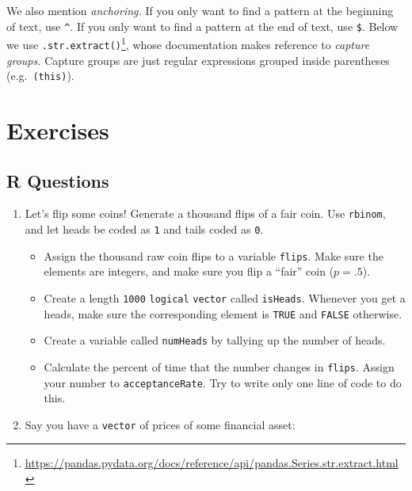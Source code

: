\documentclass[
  12pt,
  krantz2]{krantz}
\makeatletter
\newenvironment{Shaded}{\begin{snugshade}}{\end{snugshade}}
\newcommand{\BuiltInTok}[1]{#1}
\newcommand{\CommentTok}[1]{\textcolor[rgb]{0.37,0.37,0.37}{\textit{#1}}}
\newcommand{\NormalTok}[1]{#1}
\newcommand{\OperatorTok}[1]{\textcolor[rgb]{0.43,0.43,0.43}{\textbf{#1}}}
\newcommand{\StringTok}[1]{\textcolor[rgb]{0.5,0.5,0.5}{#1}}
\newcommand{\VerbatimStringTok}[1]{\textcolor[rgb]{0.5,0.5,0.5}{#1}}
\providecommand{\tightlist}{%
  \setlength{\itemsep}{0pt}\setlength{\parskip}{0pt}}
\renewcommand{\href}[2]{#2\footnote{\url{#1}}}
\newenvironment{kframe}{%
\medskip{}
\setlength{\fboxsep}{.8em}
 \def\at@end@of@kframe{}%
 \ifinner\ifhmode%
  \def\at@end@of@kframe{\end{minipage}}%
  \begin{minipage}{\columnwidth}%
 \fi\fi%
 \def\FrameCommand##1{\hskip\@totalleftmargin \hskip-\fboxsep
 \colorbox{shadecolor}{##1}\hskip-\fboxsep
     \hskip-\linewidth \hskip-\@totalleftmargin \hskip\columnwidth}%
 \MakeFramed {\advance\hsize-\width
   \@totalleftmargin\z@ \linewidth\hsize
   \@setminipage}}%
 {\par\unskip\endMakeFramed%
 \at@end@of@kframe}
\renewenvironment{Shaded}{\begin{kframe}}{\end{kframe}}
\makeatother
\begin{document}
We also mention \emph{anchoring.} If you only want to find a pattern at the beginning of text, use \texttt{\^{}}. If you only want to find a pattern at the end of text, use \texttt{\$}. Below we use \href{https://pandas.pydata.org/docs/reference/api/pandas.Series.str.extract.html}{\texttt{.str.extract()}}, whose documentation makes reference to \emph{capture groups.} Capture groups are just regular expressions grouped inside parentheses (e.g.~\texttt{(this)}).

\begin{Shaded}
\end{Shaded}

\hypertarget{exercises-1}{%
\section{Exercises}\label{exercises-1}}

\hypertarget{r-questions-1}{%
\subsection{R Questions}\label{r-questions-1}}

\begin{enumerate}
\def\labelenumi{\arabic{enumi}.}
\item
  Let's flip some coins! Generate a thousand flips of a fair coin. Use \texttt{rbinom}, and let heads be coded as \texttt{1} and tails coded as \texttt{0}.

  \begin{itemize}
  \tightlist
  \item
    Assign the thousand raw coin flips to a variable \texttt{flips}. Make sure the elements are integers, and make sure you flip a ``fair'' coin (\(p=.5\)).
  \item
    Create a length \texttt{1000} \texttt{logical} \texttt{vector} called \texttt{isHeads}. Whenever you get a heads, make sure the corresponding element is \texttt{TRUE} and \texttt{FALSE} otherwise.
  \item
    Create a variable called \texttt{numHeads} by tallying up the number of heads.
  \item
    Calculate the percent of time that the number changes in \texttt{flips}. Assign your number to \texttt{acceptanceRate}. Try to write only one line of code to do this.
  \end{itemize}
\item
  Say you have a \texttt{vector} of prices of some financial asset:
\end{enumerate}
\end{document}
